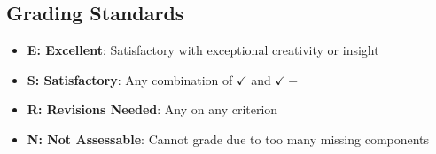 \documentclass[12pt]{article}
\begin{document}
\newpage
\subsection*{Grading Standards}
\begin{itemize}
\item \textbf{E: Excellent}: Satisfactory with exceptional creativity or insight
\item \textbf{S: Satisfactory}: Any combination of $\checkmark$ and $\checkmark\!-$
\item \textbf{R: Revisions Needed}: Any  on any criterion
\item \textbf{N: Not Assessable}: Cannot grade due to too many missing components
\end{itemize}
\end{document}
